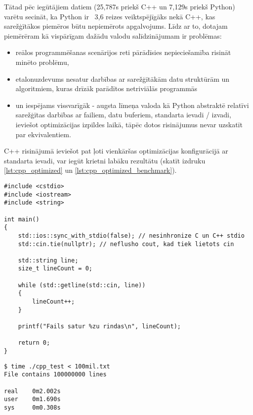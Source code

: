\documentclass[12pt]{report}%
\theoremstyle{definition}
\begin{document}
Tātad pēc iegūtājiem datiem (25,787s priekš C++ un 7,129s priekš Python) varētu secināt, ka
Python ir ~3,6 reizes veiktspējīgāks nekā C++, kas sarežģītākos piemēros būtu nepiemērots apgalvojums.
Līdz ar to, dotajam piemērēram kā vispārīgam dažādu valodu salīdzinājumam ir problēmas:
\begin{itemize}
    \item reālos programmēšanas scenārijos reti pārādīsies nepieciešamība risināt minēto problēmu, 
    \item etalonuzdevums nesatur darbības ar sarežģītākām datu struktūrām un algoritmiem, kuras drīzāk parādītos netriviālās programmās
    \item un iespējams vissvarīgāk - augsta līmeņa valoda kā Python abstraktē relatīvi sarežģītas darbības ar failiem, datu buferiem, standarta ievadi / izvadi, ieviešot optimizācijas
        izpildes laikā, tāpēc dotos risinājumus nevar uzskatīt par ekvivalentiem.
\end{itemize}

C++ risinājumā ieviešot pat ļoti vienkāršas optimizācijas konfigurācijā ar standarta ievadi, var iegūt krietni labāku rezultātu (skatīt izdruku \ref{lst:cpp_optimized} un \ref{lst:cpp_optimized_benchmark}).

\begin{lstlisting}[caption={Optimizēta vienkārša faila apstrāde valodā C++ caur standarta ievadi },
  label=lst:cpp_optimized,
  captionpos=t
]
#include <cstdio>
#include <iostream>
#include <string>

int main()
{
    std::ios::sync_with_stdio(false); // nesinhronize C un C++ stdio 
    std::cin.tie(nullptr); // neflusho cout, kad tiek lietots cin

	std::string line;
	size_t lineCount = 0;

	while (std::getline(std::cin, line))
	{
		lineCount++;
	}

	printf("Fails satur %zu rindas\n", lineCount);

	return 0;
}
\end{lstlisting}


\begin{lstlisting}[caption={Optimizētā C++ etalonuzdevuma rezultāti failam ar 100 miljoniem rindu},
  label=lst:cpp_optimized_benchmark,
  captionpos=t
]
$ time ./cpp_test < 100mil.txt 
File contains 100000000 lines

real    0m2.002s
user    0m1.690s
sys     0m0.308s
\end{lstlisting}
\end{document}
